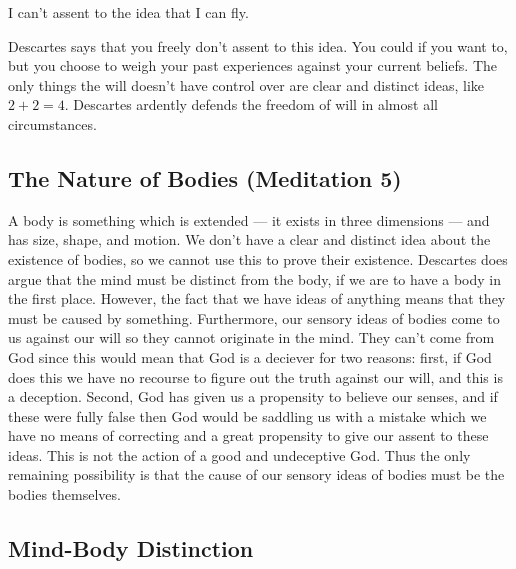 \begin{problem}
I can't assent to the idea that I can fly.

\begin{solution}[Response]
Descartes says that you freely don't assent to this idea. You could if you want to, but you choose to weigh your past experiences against your current beliefs. The only things the will doesn't have control over are clear and distinct ideas, like $2+2 = 4$. Descartes ardently defends the freedom of will in almost all circumstances.
\end{solution}
\end{problem}

\subsection{The Nature of Bodies (Meditation 5)}

A body is something which is extended --- it exists in three dimensions --- and has size, shape, and motion. We don't have a clear and distinct idea about the existence of bodies, so we cannot use this to prove their existence. Descartes does argue that the mind must be distinct from the body, if we are to have a body in the first place. However, the fact that we have ideas of anything means that they must be caused by something. Furthermore, our sensory ideas of bodies come to us against our will so they cannot originate in the mind. They can't come from God since this would mean that God is a deciever for two reasons: first, if God does this we have no recourse to figure out the truth against our will, and this is a deception. Second, God has given us a propensity to believe our senses, and if these were fully false then God would be saddling us with a mistake which we have no means of correcting and a great propensity to give our assent to these ideas. This is not the action of a good and undeceptive God. Thus the only remaining possibility is that the cause of our sensory ideas of bodies must be the bodies themselves.

\subsection{Mind-Body Distinction}

